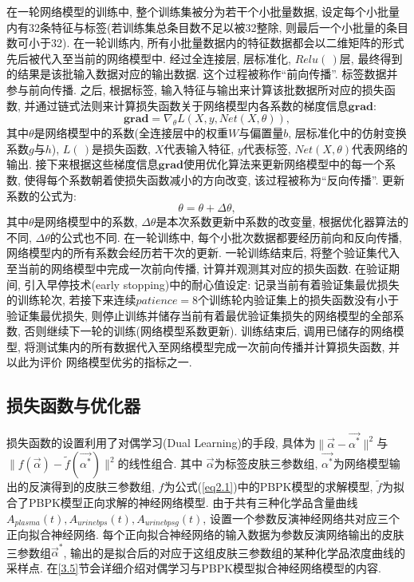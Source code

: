\documentclass[a4paper,punct=banjiao,twoside]{ctexrep}
\theoremstyle{plain}
\theoremstyle{definition}
\theoremstyle{remark}
\begin{document}
在一轮网络模型的训练中, 整个训练集被分为若干个小批量数据, 设定每个小批量内有32条特征与标签(若训练集总条目数不足以被32整除, 则最后一个小批量的条目数可小于32).
 在一轮训练内, 所有小批量数据内的特征数据都会以二维矩阵的形式先后被代入至当前的网络模型中. 经过全连接层, 层标准化, $Relu(\,)$层, 最终得到的结果是该批输入数据对应的输出数据. 这个过程被称作``前向传播''.
 标签数据并参与前向传播.
之后, 根据标签, 输入特征与输出来计算该批数据所对应的损失函数,
并通过链式法则来计算损失函数关于网络模型内各系数的梯度信息$\boldsymbol{grad}$:
$$
\boldsymbol{grad} = \nabla_{\theta} L(X,y,Net(X,\theta)),
$$ 
其中$\theta$是网络模型中的系数(全连接层中的权重$W$与偏置量$b$, 层标准化中的仿射变换系数$g$与$h$), $L(\,)$是损失函数, $X$代表输入特征, $y$代表标签, $Net(X,\theta)$代表网络的输出.
接下来根据这些梯度信息$\boldsymbol{grad}$使用优化算法来更新网络模型中的每一个系数\cite{23}, 使得每个系数朝着使损失函数减小的方向改变, 该过程被称为``反向传播''. 更新系数的公式为:
$$
\theta = \theta + \Delta \theta,
$$ 
其中$\theta$是网络模型中的系数, $\Delta \theta$是本次系数更新中系数的改变量, 根据优化器算法的不同, $\Delta \theta$的公式也不同.
在一轮训练中, 每个小批次数据都要经历前向和反向传播, 网络模型内的所有系数会经历若干次的更新.
一轮训练结束后, 将整个验证集代入至当前的网络模型中完成一次前向传播, 
计算并观测其对应的损失函数\cite{23}. 在验证期间, 引入早停技术(early stopping)中的耐心值设定: 
记录当前有着验证集最优损失的训练轮次, 若接下来连续$patience = 8$个训练轮内验证集上的损失函数没有小于验证集最优损失, 则停止训练并储存当前有着最优验证集损失的网络模型的全部系数, 否则继续下一轮的训练\cite{23}(网络模型系数更新). 
训练结束后, 调用已储存的网络模型, 将测试集内的所有数据代入至网络模型完成一次前向传播并计算损失函数, 并以此为评价
网络模型优劣的指标之一.

\subsection{损失函数与优化器}

损失函数的设置利用了对偶学习(Dual Learning)的手段, 具体为$\|\vec{\alpha}-\vec{\alpha^*} \|^2$与$\|f(\vec{\alpha})-\tilde{f}(\vec{\alpha^*}) \|^2$的线性组合. 其中
$\vec{\alpha}$为标签皮肤三参数组, $\vec{\alpha^*}$为网络模型输出的反演得到的皮肤三参数组, $f$为公式(\ref{eq2.1})中的PBPK模型的求解模型,  $\tilde{f}$为拟合了PBPK模型正向求解的神经网络模型. 由于共有三种化学品含量曲线$A_{plasma}(t), A_{urinebps}(t), A_{urinebpsg}(t)$, 设置一个参数反演神经网络共对应三个正向拟合神经网络. 
每个正向拟合神经网络的输入数据为参数反演网络输出的皮肤三参数组$\vec{\alpha}^*$, 输出的是拟合后的对应于这组皮肤三参数组的某种化学品浓度曲线的采样点. 在\ref{3.5}节会详细介绍对偶学习与PBPK模型拟合神经网络模型的内容. 
\end{document}
